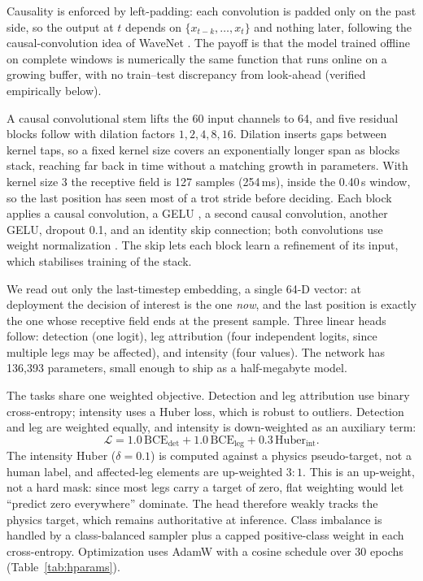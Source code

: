 \documentclass[conference]{IEEEtran}
\begin{document}
Causality is enforced by left-padding: each convolution is padded only on the past side, so the output at $t$ depends on $\{x_{t-k},\dots,x_t\}$ and nothing later, following the causal-convolution idea of WaveNet \cite{oord2016wavenet}. The payoff is that the model trained offline on complete windows is numerically the same function that runs online on a growing buffer, with no train--test discrepancy from look-ahead (verified empirically below).

A causal convolutional stem lifts the 60 input channels to 64, and five residual blocks follow with dilation factors $1,2,4,8,16$. Dilation inserts gaps between kernel taps, so a fixed kernel size covers an exponentially longer span as blocks stack, reaching far back in time without a matching growth in parameters. With kernel size 3 the receptive field is 127 samples (254\,ms), inside the 0.40\,s window, so the last position has seen most of a trot stride before deciding. Each block applies a causal convolution, a GELU \cite{hendrycks2016gelu}, a second causal convolution, another GELU, dropout 0.1, and an identity skip connection; both convolutions use weight normalization \cite{salimans2016weightnorm}. The skip lets each block learn a refinement of its input, which stabilises training of the stack.

We read out only the last-timestep embedding, a single 64-D vector: at deployment the decision of interest is the one \emph{now}, and the last position is exactly the one whose receptive field ends at the present sample. Three linear heads follow: detection (one logit), leg attribution (four independent logits, since multiple legs may be affected), and intensity (four values). The network has 136{,}393 parameters, small enough to ship as a half-megabyte model.

The tasks share one weighted objective. Detection and leg attribution use binary cross-entropy; intensity uses a Huber loss, which is robust to outliers. Detection and leg are weighted equally, and intensity is down-weighted as an auxiliary term:
\begin{equation}
\mathcal{L} = 1.0\,\mathrm{BCE}_{\text{det}} + 1.0\,\mathrm{BCE}_{\text{leg}} + 0.3\,\mathrm{Huber}_{\text{int}} .
\end{equation}
The intensity Huber ($\delta=0.1$) is computed against a physics pseudo-target, not a human label, and affected-leg elements are up-weighted $3{:}1$. This is an up-weight, not a hard mask: since most legs carry a target of zero, flat weighting would let ``predict zero everywhere'' dominate. The head therefore weakly tracks the physics target, which remains authoritative at inference. Class imbalance is handled by a class-balanced sampler plus a capped positive-class weight in each cross-entropy. Optimization uses AdamW \cite{loshchilov2019adamw} with a cosine schedule over 30 epochs (Table~\ref{tab:hparams}).
\end{document}
